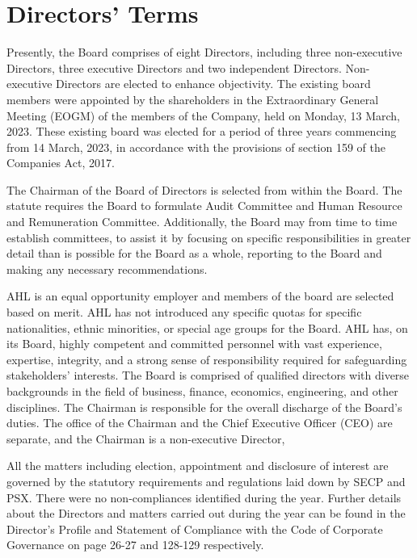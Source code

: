 \documentclass{article}
\begin{document}
\section{Directors' Terms}
Presently, the Board comprises of eight Directors, including three non-executive Directors, three executive Directors and two independent Directors. Non-executive Directors are elected to enhance objectivity. The existing board members were appointed by the shareholders in the Extraordinary General Meeting (EOGM) of the members of the Company, held on Monday, 13 March, 2023. These existing board was elected for a period of three years commencing from 14 March, 2023, in accordance with the provisions of section 159 of the Companies Act, 2017.

The Chairman of the Board of Directors is selected from within the Board. The statute requires the Board to formulate Audit Committee and Human Resource and Remuneration Committee. Additionally, the Board may from time to time establish committees, to assist it by focusing on specific responsibilities in greater detail than is possible for the Board as a whole, reporting to the Board and making any necessary recommendations.

AHL is an equal opportunity employer and members of the board are selected based on merit. AHL has not introduced any specific quotas for specific nationalities, ethnic minorities, or special age groups for the Board. AHL has, on its Board, highly competent and committed personnel with vast experience, expertise, integrity, and a strong sense of responsibility required for safeguarding stakeholders’ interests. The Board is comprised of qualified directors with diverse backgrounds in the field of business, finance, economics, engineering, and other disciplines. The Chairman is responsible for the overall discharge of the Board’s duties. The office of the Chairman and the Chief Executive Officer (CEO) are separate, and the Chairman is a non-executive Director,

All the matters including election, appointment and disclosure of interest are governed by the statutory requirements and regulations laid down by SECP and PSX. There were no non-compliances identified during the year. Further details about the Directors and matters carried out during the year can be found in the Director’s Profile and Statement of Compliance with the Code of Corporate Governance on page 26-27 and 128-129 respectively.
\end{document}
